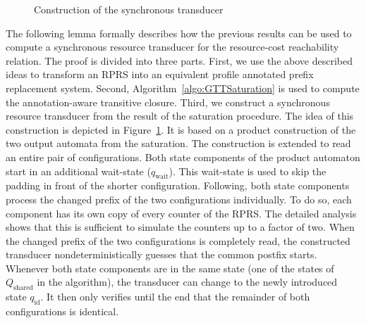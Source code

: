 \documentclass{LMCS}
\newcommand{\eps}{\varepsilon}
\newcommand{\automatonA}{\mathfrak A}
\newcommand{\automatonT}{\mathfrak T}
\newcommand{\RPRS}{\textsf{RPRS}}
\begin{document}
\begin{figure}[t]
\begin{center}
   \end{center}
  \caption{Construction of the synchronous transducer}
  \label{fig:r1Rr2ReverseRecognition}
\end{figure}


The following lemma formally describes how the previous results can be 
used to compute a synchronous resource transducer for the resource-cost 
reachability relation. The proof is divided into three parts. First, we
use the above described ideas to transform an \RPRS{} into an equivalent
profile annotated prefix replacement system. Second, 
Algorithm~\ref{algo:GTTSaturation} is used to compute the annotation-aware
transitive closure. Third, we construct a synchronous resource transducer
from the result of the saturation procedure. The idea of this construction is
depicted in Figure~\ref{fig:r1Rr2ReverseRecognition}. It is based on a 
product construction of the two output automata from the saturation. The 
construction is extended to read an entire pair of configurations. Both state 
components of the product automaton start in an additional wait-state 
($q_{\mathrm{wait}}$). This wait-state is used to skip the padding in front of 
the shorter configuration. Following, both state components process the 
changed prefix of the two configurations individually. To do so, each 
component has its own copy of every counter of the \RPRS{}. The detailed 
analysis shows that this is sufficient to simulate the counters up to a factor
of two. When the changed prefix of the two configurations is completely read,
the constructed transducer nondeterministically guesses that the 
common postfix starts. Whenever both state components are in the same state 
(one of the states of $Q_{\mathrm{shared}}$ in the algorithm), the transducer
can change to the newly introduced state  $q_{\mathrm{id}}$. It then only 
verifies until the end that the remainder of both configurations is identical. 
\end{document}
